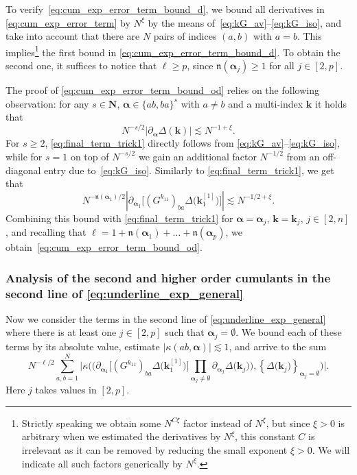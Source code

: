 \documentclass[10pt]{amsart}
\numberwithin{equation}{section}
\newcommand{\N}{\mathbf{N}}
\begin{document}
To verify~\eqref{eq:cum_exp_error_term_bound_d}, we bound all derivatives in \eqref{eq:cum_exp_error_term} by $N^\xi$ by the means of~\eqref{eq:kG_av}--\eqref{eq:kG_iso}, and take into account that there are $N$ pairs of indices $(a,b)$ with $a=b$. This implies\footnote{Strictly speaking we obtain some $N^{C\xi}$ factor instead of $N^\xi$, but since
$\xi>0$ is arbitrary when we estimated the derivatives by $N^\xi$, 
this constant $C$ is irrelevant as it can be removed by reducing the small exponent $\xi>0$.
We will indicate all such factors generically by $N^\xi$.}  the first bound in \eqref{eq:cum_exp_error_term_bound_d}. To obtain the second one, it suffices to notice that $\ell\ge p$, since $\mathfrak{n}(\bm{\alpha}_j)\ge 1$ for all $j\in [2,p]$.

The proof of \eqref{eq:cum_exp_error_term_bound_od} relies on the following observation: for any $s\in \N$, $\bm{\alpha}\in\{ab,ba\}^s$ with $a\neq b$ and a multi-index $\bm{k}$ it holds that
\begin{equation}
N^{-s/2} \left\vert \partial_{\bm{\alpha}} \Delta(\bm{k})\right\vert \lesssim N^{-1+\xi}.
\label{eq:final_term_trick1} 
\end{equation}
For $s\ge 2$, \eqref{eq:final_term_trick1} directly follows from \eqref{eq:kG_av}--\eqref{eq:kG_iso}, while for $s=1$ on top of $N^{-s/2}$ we gain an additional factor $N^{-1/2}$ from an off-diagonal entry due to~\eqref{eq:kG_iso}. Similarly to \eqref{eq:final_term_trick1}, we get that
\begin{equation}
N^{-\mathfrak{n}(\bm{\alpha}_1)/2}\left\vert\partial_{\bm{\alpha}_1}\Big[\left(G^{k_{11}}\right)_{ba}\Delta\big(\bm{k}_1^{[1]}\big)\Big]\right\vert \lesssim N^{-1/2+\xi}.
\label{eq:alpha1_bound}
\end{equation}
Combining this bound with \eqref{eq:final_term_trick1} for $\bm{\alpha}=\bm{\alpha}_j$, $\bm{k}=\bm{k}_j$, $j\in [2,n]$, and recalling that $\ell= 1+\mathfrak{n}(\bm{\alpha}_1)+\ldots+\mathfrak{n}(\bm{\alpha}_p)$, we obtain~\eqref{eq:cum_exp_error_term_bound_od}.
 

\subsubsection{Analysis of the second and higher order cumulants in the second line of \eqref{eq:underline_exp_general}}\label{sec:cum_exp_terms}

Now we consider the terms in the second line of \eqref{eq:underline_exp_general} where there is at least one $j\in [2,p]$ such that $\bm{\alpha}_j=\emptyset$. We bound each of these terms by its absolute value, estimate $|\kappa(ab,\bm{\alpha})|\lesssim 1$, and arrive to the sum
\begin{equation}
N^{-\ell/2}\sum_{a,b=1}^N\Bigg|\kappa\Bigg(\bigg(\partial_{\bm{\alpha}_1}\Big[\left(G^{k_{11}}\right)_{ba}\Delta\big(\bm{k}_1^{[1]}\big)\Big] \prod_{\bm{\alpha}_j\neq \emptyset} \partial_{\bm{\alpha}_j}\Delta\big(\bm{k}_j\big)\bigg),\left\lbrace \Delta\big(\bm{k}_j\big)\right\rbrace_{\bm{\alpha}_j=\emptyset}\Bigg)\Bigg|.
\label{eq:cum_intermediate}
\end{equation}
Here $j$ takes values in $[2,p]$. 
\end{document}
